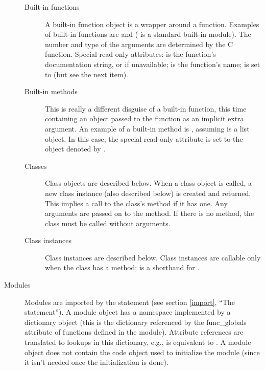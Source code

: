 \begin{description}
\begin{description}
\item[Built-in functions]
A built-in function object is a wrapper around a \C{} function.  Examples
of built-in functions are  and 
( is a standard built-in module).
The number and type of the arguments are
determined by the C function.
Special read-only attributes:  is the function's
documentation string, or  if unavailable; 
is the function's name;  is set to  (but see
the next item).

\item[Built-in methods]
This is really a different disguise of a built-in function, this time
containing an object passed to the \C{} function as an implicit extra
argument.  An example of a built-in method is
, assuming
 is a list object.
In this case, the special read-only attribute  is set
to the object denoted by .

\item[Classes]
Class objects are described below.  When a class object is called,
a new class instance (also described below) is created and
returned.  This implies a call to the class's  method
if it has one.  Any arguments are passed on to the 
method.  If there is no  method, the class must be called
without arguments.

\item[Class instances]
Class instances are described below.  Class instances are callable
only when the class has a  method; 
is a shorthand for .

\end{description}

\item[Modules]
Modules are imported by the  statement (see section
\ref{import}, ``The  statement'').
A module object has a namespace implemented by a dictionary object
(this is the dictionary referenced by the func_globals attribute of
functions defined in the module).  Attribute references are translated
to lookups in this dictionary, e.g.,  is equivalent to
.
A module object does not contain the code object used to
initialize the module (since it isn't needed once the initialization
is done).


\end{description}
